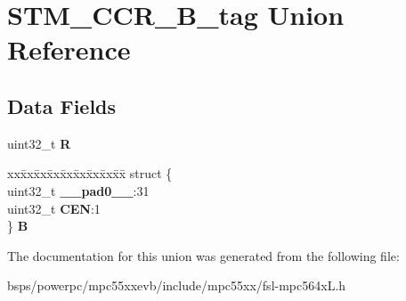 \hypertarget{unionSTM__CCR__32B__tag}{}\section{S\+T\+M\+\_\+\+C\+C\+R\+\_\+B\+\_\+tag Union Reference}
\label{unionSTM__CCR__32B__tag}
\subsection*{Data Fields}
\begin{DoxyCompactItemize}
\item 
\mbox{\label{unionSTM__CCR__32B__tag_a73485279bbe863b3c99afcbb9dc644c5}} 
uint32\+\_\+t {\bfseries R}
\item 
\mbox{\label{unionSTM__CCR__32B__tag_a36c8976fc8fa8a9d2312dd0d2cb93944}} 
\begin{tabbing}
xx\=xx\=xx\=xx\=xx\=xx\=xx\=xx\=xx\=\kill
struct \{\\
\>uint32\_t {\bfseries \_\_pad0\_\_}:31\\
\>uint32\_t {\bfseries CEN}:1\\
\} {\bfseries B}\\

\end{tabbing}\end{DoxyCompactItemize}


The documentation for this union was generated from the following file\+:\begin{DoxyCompactItemize}
\item 
bsps/powerpc/mpc55xxevb/include/mpc55xx/fsl-\/mpc564x\+L.\+h\end{DoxyCompactItemize}
